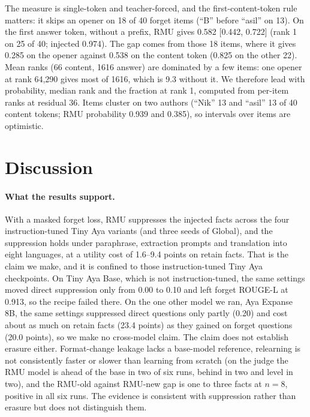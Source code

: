 \documentclass[10pt,twocolumn]{article}
\begin{document}
The measure is single-token and teacher-forced, and the first-content-token rule matters: it skips an opener on 18 of 40 forget items (``B'' before ``asil'' on 13). On the first answer token, without a prefix, RMU gives 0.582 [0.442, 0.722] (rank 1 on 25 of 40; injected 0.974). The gap comes from those 18 items, where it gives 0.285 on the opener against 0.538 on the content token (0.825 on the other 22). Mean ranks (66 content, 1616 answer) are dominated by a few items: one opener at rank 64{,}290 gives most of 1616, which is 9.3 without it. We therefore lead with probability, median rank and the fraction at rank 1, computed from per-item ranks at residual 36. Items cluster on two authors (``Nik'' 13 and ``asil'' 13 of 40 content tokens; RMU probability 0.939 and 0.385), so intervals over items are optimistic.

\section{Discussion}
\label{sec:discussion}
\paragraph{What the results support.} With a masked forget loss, RMU suppresses the injected facts across the four instruction-tuned Tiny Aya variants (and three seeds of Global), and the suppression holds under paraphrase, extraction prompts and translation into eight languages, at a utility cost of 1.6--9.4 points on retain facts. That is the claim we make, and it is confined to those instruction-tuned Tiny Aya checkpoints. On Tiny Aya Base, which is not instruction-tuned, the same settings moved direct suppression only from 0.00 to 0.10 and left forget ROUGE-L at 0.913, so the recipe failed there. On the one other model we ran, Aya Expanse 8B, the same settings suppressed direct questions only partly (0.20) and cost about as much on retain facts (23.4 points) as they gained on forget questions (20.0 points), so we make no cross-model claim. The claim does not establish erasure either. Format-change leakage lacks a base-model reference, relearning is not consistently faster or slower than learning from scratch (on the judge the RMU model is ahead of the base in two of six runs, behind in two and level in two), and the RMU-old against RMU-new gap is one to three facts at $n=8$, positive in all six runs. The evidence is consistent with suppression rather than erasure but does not distinguish them.
\end{document}
